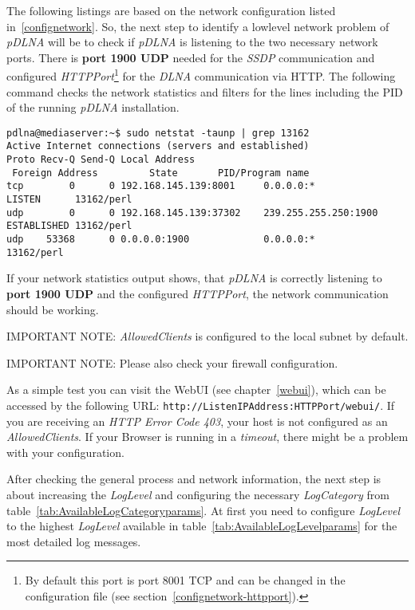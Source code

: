 The following listings are based on the network configuration listed in~\ref{confignetwork}. So, the next step to identify a lowlevel network problem of {\em pDLNA} will be to check if {\em pDLNA} is listening to the two necessary network ports. There is \textbf{port 1900 UDP} needed for the {\em SSDP} communication and configured {\em HTTPPort}\footnote{By default this port is port 8001 TCP and can be changed in the configuration file (see section~\ref{confignetwork-httpport}).} for the {\em DLNA} communication via HTTP. The following command checks the network statistics and filters for the lines including the PID of the running {\em pDLNA} installation.
\begin{lstlisting}
pdlna@mediaserver:~$ sudo netstat -taunp | grep 13162
Active Internet connections (servers and established)
Proto Recv-Q Send-Q Local Address
 Foreign Address         State       PID/Program name
tcp        0      0 192.168.145.139:8001     0.0.0.0:*               LISTEN      13162/perl
udp        0      0 192.168.145.139:37302    239.255.255.250:1900    ESTABLISHED 13162/perl
udp    53368      0 0.0.0.0:1900             0.0.0.0:*                           13162/perl
\end{lstlisting}
If your network statistics output shows, that {\em pDLNA} is correctly listening to \textbf{port 1900 UDP} and the configured {\em HTTPPort}, the network communication should be working.

\begin{colframeimportantnote}
\textsc{IMPORTANT NOTE:} {\em AllowedClients} is configured to the local subnet by default.
\end{colframeimportantnote}

\begin{colframeimportantnote}
\textsc{IMPORTANT NOTE:} Please also check your firewall configuration.
\end{colframeimportantnote}

As a simple test you can visit the WebUI (see chapter~\ref{webui}), which can be accessed by the following URL: \verb|http://ListenIPAddress:HTTPPort/webui/|. If you are receiving an {\em HTTP Error Code 403}, your host is not configured as an {\em AllowedClients}. If your Browser is running in a {\em timeout}, there might be a problem with your configuration.

After checking the general process and network information, the next step is about increasing the {\em LogLevel} and configuring the necessary {\em LogCategory} from table~\ref{tab:AvailableLogCategoryparams}. At first you need to configure {\em LogLevel} to the highest {\em LogLevel} available in table~\ref{tab:AvailableLogLevelparams} for the most detailed log messages.


